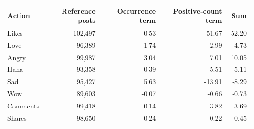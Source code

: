 \begin{tabular}{lrrrr}
\toprule
Action & Reference posts & Occurrence term & Positive-count term & Sum \\
\midrule
Likes & 102,497 & -0.53 & -51.67 & -52.20 \\
Love & 96,389 & -1.74 & -2.99 & -4.73 \\
Angry & 99,987 & 3.04 & 7.01 & 10.05 \\
Haha & 93,358 & -0.39 & 5.51 & 5.11 \\
Sad & 95,427 & 5.63 & -13.91 & -8.29 \\
Wow & 89,603 & -0.07 & -0.66 & -0.73 \\
Comments & 99,418 & 0.14 & -3.82 & -3.69 \\
Shares & 98,650 & 0.24 & 0.22 & 0.45 \\
\bottomrule
\end{tabular}
